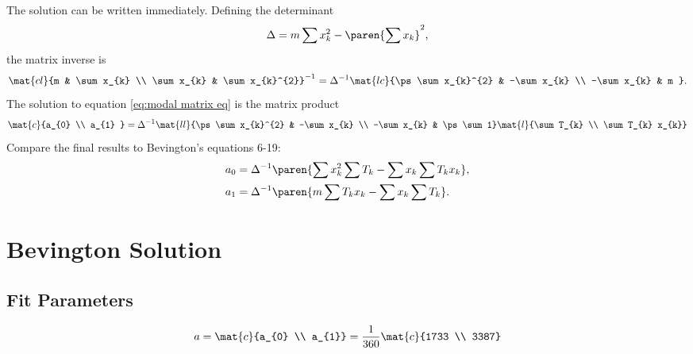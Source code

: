 The solution can be written immediately. Defining the determinant
  \begin{equation*}   %
    \Delta = m \sum x_{k}^{2} - \paren{\sum x_{k}}^{2},
  \end{equation*}
the matrix inverse is
  \begin{equation*}   %
    \mat{cl}{m & \sum x_{k} \\ \sum x_{k} & \sum x_{k}^{2}}^{-1} = \Delta^{-1} 
    \mat{lc}{\ps \sum x_{k}^{2} & -\sum x_{k} \\ -\sum x_{k} & m } .
  \end{equation*}
The solution to equation \eqref{eq:modal matrix eq} is the matrix product
  \begin{equation*}
    \mat{c}{a_{0} \\ a_{1} } = \Delta^{-1}
    \mat{ll}{\ps \sum x_{k}^{2} & -\sum x_{k} \\ -\sum x_{k} & \ps \sum 1}
    \mat{l}{\sum T_{k} \\ \sum T_{k} x_{k}}
    \label{eqn:bevington solution product}
  \end{equation*}
Compare the final results to Bevington's equations 6-19:
  \begin{equation*}
  \begin{split}
    a_{0} &= \Delta^{-1} \paren{\sum x_{k}^{2}\sum T_{k} - \sum x_{k}\sum T_{k} x_{k}}, \\
    a_{1} &= \Delta^{-1} \paren{m \sum T_{k} x_{k} - \sum x_{k}\sum T_{k}}.
  \label{eqn:bevington soln}
  \end{split}
  \end{equation*}
  
\section{\label{sec:bevington solution}Bevington Solution}  %

\subsection{Fit Parameters}  %
  \begin{equation*}   %
      a = \mat{c}{a_{0} \\ a_{1}} = \frac{1}{360} \mat{c}{1733 \\ 3387}
  \end{equation*}

